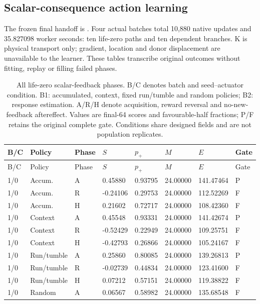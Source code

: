 \subsection*{Scalar-consequence action learning}
The frozen final handoff is . Four actual batches total 10,880 native updates and 35.827098 worker seconds: ten life-zero paths and ten dependent branches. K is physical transport only; gradient, location and donor displacement are unavailable to the learner. These tables transcribe original outcomes without fitting, replay or filling failed phases.
\begingroup\scriptsize\setlength{\tabcolsep}{3pt}\setlength{\LTpre}{6pt}\setlength{\LTpost}{6pt}
\begin{longtable}{llllllll}
\caption{All life-zero scalar-feedback phases. B/C denotes batch and seed--actuator condition. B1: accumulated, context, fixed run/tumble and random policies; B2: response estimation. A/R/H denote acquisition, reward reversal and no-new-feedback aftereffect. Values are final-64 scores and favourable-half fractions; P/F retains the original complete gate. Conditions share designed fields and are not population replicates.}\label{tab:scalar-phases}\\
\toprule
B/C & Policy & Phase & $S$ & $p_+$ & $M$ & $E$ & Gate \\
\midrule
\endfirsthead
\toprule
B/C & Policy & Phase & $S$ & $p_+$ & $M$ & $E$ & Gate \\
\midrule
\endhead
1/0 & Accum. & A & 0.45880 & 0.93795 & 24.00000 & 141.47464 & P \\
1/0 & Accum. & R & -0.24106 & 0.29753 & 24.00000 & 112.52269 & F \\
1/0 & Accum. & H & 0.21602 & 0.72717 & 24.00000 & 108.42360 & F \\
1/0 & Context & A & 0.45548 & 0.93331 & 24.00000 & 141.42674 & P \\
1/0 & Context & R & -0.52429 & 0.22949 & 24.00000 & 109.25751 & F \\
1/0 & Context & H & -0.42793 & 0.26866 & 24.00000 & 105.24167 & F \\
1/0 & Run/tumble & A & 0.25860 & 0.80085 & 24.00000 & 139.26813 & P \\
1/0 & Run/tumble & R & -0.02739 & 0.44834 & 24.00000 & 123.41600 & F \\
1/0 & Run/tumble & H & 0.07212 & 0.57151 & 24.00000 & 119.38822 & F \\
1/0 & Random & A & 0.06567 & 0.58982 & 24.00000 & 135.68548 & F \\

\end{longtable}
